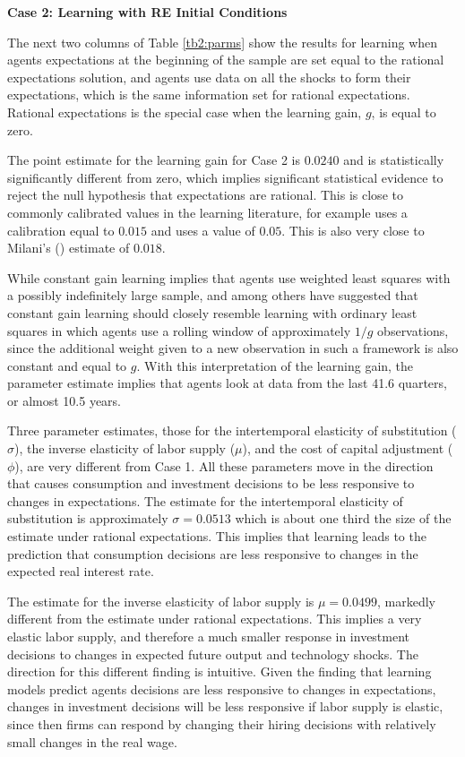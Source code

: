 \noindent \textbf{Case 2: Learning with RE Initial Conditions}

The next two columns of Table \ref{tb2:parms} show the results for learning when agents expectations at the beginning of the sample are set equal to the rational expectations solution, and agents use data on all the shocks to form their expectations, which is the same information set for rational expectations.  Rational expectations is the special case when the learning gain, $g$, is equal to zero.  

The point estimate for the learning gain for Case 2 is $0.0240$ and is statistically significantly different from zero, which implies significant statistical evidence to reject the null hypothesis that expectations are rational.  This is close to commonly calibrated values in the learning literature, for example  uses a calibration equal to $0.015$ and  uses a value of $0.05$.  This is also very close to Milani's (\citeyear{milani2007}) estimate of $0.018$.

While constant gain learning implies that agents use weighted least squares with a possibly indefinitely large sample,  and  among others have suggested that constant gain learning should closely resemble learning with ordinary least squares in which agents use a rolling window of approximately $1/g$ observations, since the additional weight given to a new observation in such a framework is also constant and equal to $g$.  With this interpretation of the learning gain, the parameter estimate implies that agents look at data from the last 41.6 quarters, or almost 10.5 years.

Three parameter estimates, those for the intertemporal elasticity of substitution ($\sigma$), the inverse elasticity of labor supply ($\mu$), and the cost of capital adjustment ($\phi$), are very different from Case 1.  All these parameters move in the direction that causes consumption and investment decisions to be less responsive to changes in expectations.  The estimate for the intertemporal elasticity of substitution is approximately $\sigma=0.0513$ which is about one third the size of the estimate under rational expectations.  This implies that learning leads to the prediction that consumption decisions are less responsive to changes in the expected real interest rate.  

The estimate for the inverse elasticity of labor supply is $\mu=0.0499$, markedly different from the estimate under rational expectations.  This implies a very elastic labor supply, and therefore a much smaller response in investment decisions to changes in expected future output and technology shocks.  The direction for this different finding is intuitive.  Given the finding that learning models predict agents decisions are less responsive to changes in expectations, changes in investment decisions will be less responsive if labor supply is elastic, since then firms can respond by changing their hiring decisions with relatively small changes in the real wage.

